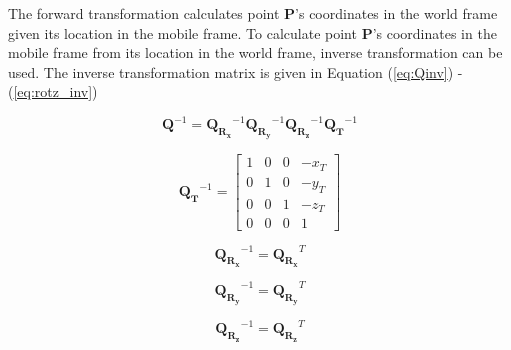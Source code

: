 The forward transformation calculates point $\boldsymbol{P}$'s
coordinates in the world frame given its location in the mobile frame.
To calculate point $\boldsymbol{P}$'s coordinates in the mobile frame
from its location in the world frame, inverse transformation can
be used. The inverse transformation matrix is given in Equation
(\ref{eq:Qinv}) - (\ref{eq:rotz_inv})

\begin{equation}
\label{eq:Qinv}
\boldsymbol{Q}^{-1}=\boldsymbol{Q_{R_x}}^{-1}\boldsymbol{Q_{R_y}}^{-1}
\boldsymbol{Q_{R_z}}^{-1} \boldsymbol{Q_T}^{-1}
\end{equation}

\begin{equation}
\label{eq:translate_inv}
\boldsymbol{Q_{T}}^{-1}=\begin{bmatrix}
1 & 0 & 0 & -x_T \\
0 & 1 & 0 & -y_T \\
0 & 0 & 1 & -z_T \\
0 & 0 & 0 & 1\end{bmatrix}
\end{equation}

\begin{equation}
\label{eq:rotx_inv}
\boldsymbol{Q_{R_x}}^{-1}=\boldsymbol{Q_{R_x}}^{T}
\end{equation}

\begin{equation}
\label{eq:roty_inv}
\boldsymbol{Q_{R_y}}^{-1}=\boldsymbol{Q_{R_y}}^{T}
\end{equation}

\begin{equation}
\label{eq:rotz_inv}
\boldsymbol{Q_{R_z}}^{-1}=\boldsymbol{Q_{R_z}}^{T}
\end{equation}




